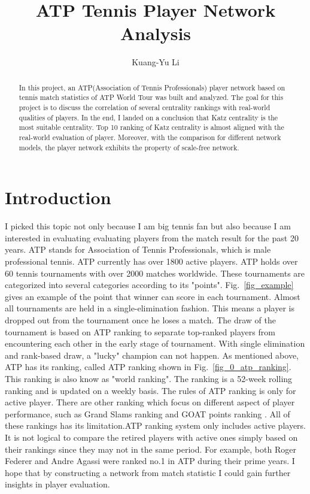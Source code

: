 \documentclass[runningheads]{llncs}
\begin{document}
%
\title{ATP Tennis Player Network Analysis}

\author{Kuang-Yu Li}

%
\maketitle              %
%
\begin{abstract}
In this project, an ATP(Association of Tennis Professionals) player network 
based on tennis match statistics of ATP World Tour was built and analyzed.
The goal for this project is to discuss the correlation of several centrality rankings with 
real-world qualities of players. In the end, I landed on a conclusion that Katz centrality is the most
suitable centrality. Top 10 ranking of Katz centrality is almost aligned with the real-world evaluation of 
player. Moreover, with the comparison for different network models, the player network exhibits the 
property of scale-free network. 

\end{abstract}
%
%
%
\section{Introduction}
I picked this topic not only because I am big tennis fan but also because I am interested in evaluating evaluating players from the match result for the past 20 years. 
ATP stands for Association of Tennis Professionals, which is male professional tennis. ATP currently has over 1800 active players. ATP holds over 60 tennis tournaments with over 2000 matches worldwide. These tournaments are categorized into several categories according to its "points". 
Fig.~\ref{fig_example} gives an example of the point that winner can score in each tournament. Almost all tournaments are held in a single-elimination fashion. This means a player is dropped out from the tournament once he loses a match. The draw of the tournament is based on ATP ranking to separate top-ranked players from encountering each other in the early stage of tournament. With single elimination and rank-based draw, a "lucky" champion can not happen.
As mentioned above, ATP has its ranking, called ATP ranking \cite{ref_url_atp} shown in Fig.~\ref{fig_0_atp_ranking}. This ranking is also know as "world ranking". The ranking is a 52-week rolling ranking and is updated on a weekly basis. The rules of ATP ranking is only for active player. There are other ranking which focus on different aspect of player performance, such as Grand Slams ranking and GOAT points ranking \cite{ref_url_goat}. All of these rankings has its limitation.ATP ranking system only includes  active players. It is not logical to compare the retired players with active ones simply based on their rankings since they may not in the same period. For example, both Roger Federer and Andre Agassi were ranked no.1 in ATP during their prime years. I hope that by constructing a network from match statistic I could gain further insights in player evaluation. 
\end{document}
